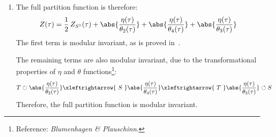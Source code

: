 \documentclass[a4paper,10pt]{article}
\begin{document}
\begin{enumerate}
\begin{enumerate}
	\item The full partition function is therefore:
	\begin{equation}
		Z(\tau)
		= \frac{1}{2}\,Z_{S^1}(\tau)
			+ \abs{\frac{\eta(\tau)}{\theta_2(\tau)}}
			+ \abs{\frac{\eta(\tau)}{\theta_4(\tau)}}
			+ \abs{\frac{\eta(\tau)}{\theta_3(\tau)}}
	\end{equation}
	The first term is modular invariant, as is proved in \,. 
	
	The remaining terms are also modular invariant, due to the transformational properties of $\eta$ and $\theta$ functions\footnote{
		Reference: \textit{Blumenhagen \& Plauschinn}. 
	}:
	\begin{equation}
		T \circlearrowright
		\abs{\frac{\eta(\tau)}{\theta_2(\tau)}}
		\xleftrightarrow{\ S\ }
		\abs{\frac{\eta(\tau)}{\theta_4(\tau)}}
		\xleftrightarrow{\ T\ }
		\abs{\frac{\eta(\tau)}{\theta_3(\tau)}}
		\circlearrowleft S
	\end{equation}
	Therefore, the full partition function is modular invariant. 
	
	\end{enumerate}
	

\end{enumerate}
\end{document}
